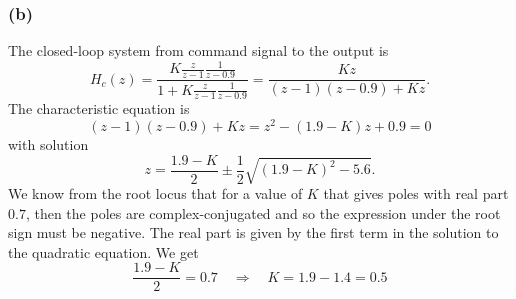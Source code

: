 \documentclass[letter,12pt]{article}
\begin{document}
\subsubsection*{(b)}

The closed-loop system from command signal to the output is
\[ H_c(z) = \frac{K \frac{z}{z-1}\frac{1}{z-0.9}}{1 + K \frac{z}{z-1}\frac{1}{z-0.9}} = \frac{Kz}{(z-1)(z-0.9) + Kz}. \]
The characteristic equation is 
\[ (z-1)(z-0.9) + Kz = z^2 - (1.9-K)z + 0.9 = 0 \]
with solution
\[ z = \frac{1.9-K}{2} \pm \frac{1}{2}\sqrt{(1.9-K)^2 - 5.6}. \]
We know from the root locus that for a value of  $K$ that gives poles with real part $0.7$, then the poles are complex-conjugated and so the expression under the root sign must be negative. The real part is given by the first term in the solution to the quadratic equation. We get
\[ \frac{1.9-K}{2} = 0.7 \quad \Rightarrow \quad K = 1.9-1.4 = 0.5 \]
\end{document}
